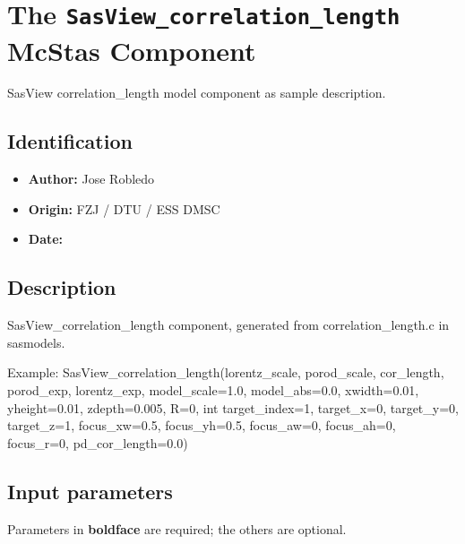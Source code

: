 \section{The \texttt{SasView\_correlation\_length} McStas Component}
SasView correlation\_length model component as sample description.

\subsection*{Identification}
\begin{itemize}
  \item \textbf{Author:} Jose Robledo
  \item \textbf{Origin:} FZJ / DTU / ESS DMSC
  \item \textbf{Date:} 
\end{itemize}

\subsection*{Description}
SasView\_correlation\_length component, generated from correlation\_length.c in sasmodels.

Example: SasView\_correlation\_length(lorentz\_scale, porod\_scale, cor\_length, porod\_exp, lorentz\_exp, model\_scale=1.0, model\_abs=0.0, xwidth=0.01, yheight=0.01, zdepth=0.005, R=0, int target\_index=1, target\_x=0, target\_y=0, target\_z=1, focus\_xw=0.5, focus\_yh=0.5, focus\_aw=0, focus\_ah=0, focus\_r=0, pd\_cor\_length=0.0)

\subsection*{Input parameters}
Parameters in \textbf{boldface} are required; the others are optional.

